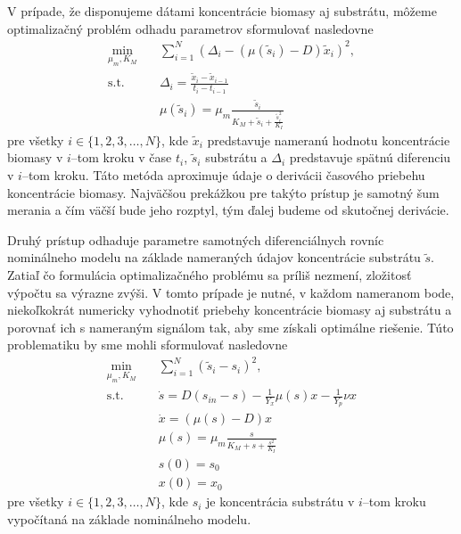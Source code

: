 V prípade, že disponujeme dátami koncentrácie biomasy aj substrátu, môžeme optimalizačný problém odhadu parametrov sformulovať nasledovne
\begin{equation}
\label{eq:twostep_der_app}
	\begin{split}
		\min_{\mu_{m},K_{M}} \quad &\sum_{i=1}^{N} \left(\Delta_{i} - \left(\mu(\tilde{s}_{i}) - D\right)\tilde{x}_{i}\right)^2, \\
		\text{s.t.} \quad &\Delta_{i} = \frac{\tilde{x}_{i} - \tilde{x}_{i-1}}{t_{i} - t_{i-1}} \\
		\quad &\mu(\tilde{s}_{i})=\mu_{m}\frac{\tilde{s}_{i}}{K_{M} + \tilde{s}_{i} + \frac{\tilde{s}_{i}^2}{K_{I}}}
	\end{split}
\end{equation} 
pre všetky $ i \in \lbrace 1,2,3,\dots,N \rbrace $, kde $ \tilde{x}_{i} $ predstavuje nameranú hodnotu koncentrácie biomasy v $ i $--tom kroku v čase $ t_i $, $ \tilde{s}_{i} $ substrátu a $ \Delta_{i} $ predstavuje spätnú diferenciu v $ i $--tom kroku. Táto metóda aproximuje údaje o derivácii časového priebehu koncentrácie biomasy. 
Najväčšou prekážkou pre takýto prístup je samotný šum merania a čím väčší bude jeho rozptyl, tým ďalej budeme od skutočnej derivácie.

Druhý prístup odhaduje parametre samotných diferenciálnych rovníc nominálneho modelu na základe nameraných údajov koncentrácie substrátu $ \tilde{s} $. Zatiaľ čo formulácia optimalizačného problému sa príliš nezmení, zložitosť výpočtu sa výrazne zvýši. V tomto prípade je nutné, v každom nameranom bode, niekoľkokrát numericky vyhodnotiť priebehy koncentrácie biomasy aj substrátu a porovnať ich s nameraným signálom  tak, aby sme získali optimálne riešenie. Túto problematiku by sme mohli sformulovať nasledovne
\begin{equation}
\label{eq:twostep_diff_pe}
	\begin{split}
		\min_{\mu_{m},K_{M}} \quad & \sum_{i=1}^{N} \left(\tilde{s}_{i}-s_{i}\right)^2, \\
		\textrm{s.t.} \quad & \dot{s} = D(s_{in}-s)-\frac{1}{Y_x}\mu(s)x-\frac{1}{Y_p}\nu x \\
		& \dot{x} = (\mu(s)-D)x \\
		& \mu(s)=\mu_{m}\frac{s}{K_{M} + s + \frac{s^2}{K_{I}}} \\
		& s(0) = s_0 \\
		& x(0) = x_0
	\end{split}
\end{equation}
pre všetky $ i \in \lbrace 1,2,3,\dots,N \rbrace $, kde $ s_{i} $ je koncentrácia substrátu v $ i $--tom kroku vypočítaná na základe nominálneho modelu.

